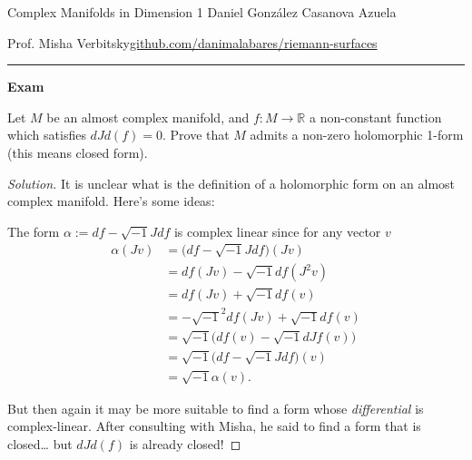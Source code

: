 
%



\begin{minipage}{\textwidth}
		Complex Manifolds in Dimension 1 \hfill Daniel González Casanova Azuela
		
		{Prof. Misha Verbitsky\hfill\href{https://github.com/danimalabares/riemann-surfaces}{github.com/danimalabares/riemann-surfaces}}
\end{minipage}\vspace{.2cm}\hrule

\vspace{10pt}
{\huge\bfseries Exam}

\tableofcontents

\begin{manualexercise}{1.3}
	Let $M$ be an almost complex manifold, and $f:M\to \mathbb{R}$ a non-constant function which satisfies $d Jd(f)=0$. Prove that $M$ admits a non-zero holomorphic 1-form (this means closed form).
\end{manualexercise}

\begin{proof}[Solution]
	It is unclear what is the definition of a holomorphic form on an almost complex manifold. Here's some ideas:

	The form $\alpha:=df-\sqrt{-1}Jdf$ is complex linear since for any vector $v$
	\begin{align*}
		\alpha(Jv)&=\Big(df-\sqrt{-1}Jdf\Big)(Jv)\\
		&=df(Jv)-\sqrt{-1}df(J^2v)\\
		&=df(Jv)+\sqrt{-1}df(v)\\
		&=-\sqrt{-1}^2df(Jv)+\sqrt{-1}df(v)\\
		&=\sqrt{-1}\Big(df(v)-\sqrt{-1}d Jf(v)\Big)\\
		&=\sqrt{-1}\Big(df-\sqrt{-1}Jdf\Big)(v)\\
		&=\sqrt{-1}\alpha(v).
	\end{align*}

But then again it may be more suitable to find a form whose \textit{differential} is complex-linear. After consulting with Misha, he said to find a form that is closed… but $d Jd(f)$ is already closed!
\end{proof}

